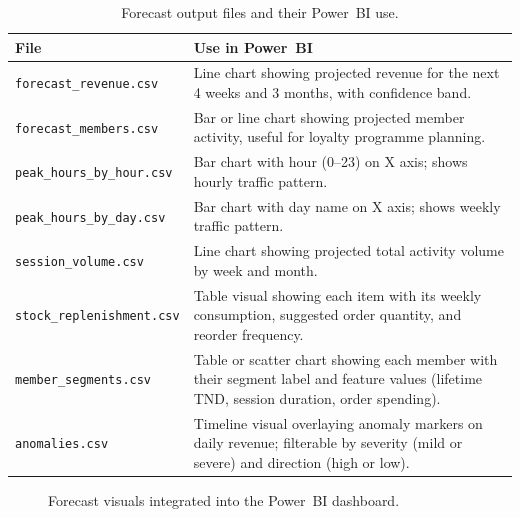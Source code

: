 \documentclass[12pt, a4paper]{report}
\begin{document}
\begin{table}[H]
  \centering
  \caption{Forecast output files and their Power~BI use.\label{tab:forecast_files}}
  \begin{tabular}{p{5cm} p{7.5cm}}
    \toprule
    \textbf{File} & \textbf{Use in Power~BI} \\
    \midrule
    \texttt{forecast\_revenue.csv}
      & Line chart showing projected revenue for the next 4 weeks and 3 months,
        with confidence band. \\[4pt]
    \texttt{forecast\_members.csv}
      & Bar or line chart showing projected member activity, useful for
        loyalty programme planning. \\[4pt]
    \texttt{peak\_hours\_by\_hour.csv}
      & Bar chart with hour (0--23) on X axis; shows hourly traffic pattern. \\[4pt]
    \texttt{peak\_hours\_by\_day.csv}
      & Bar chart with day name on X axis; shows weekly traffic pattern. \\[4pt]
    \texttt{session\_volume.csv}
      & Line chart showing projected total activity volume by week and month. \\[4pt]
    \texttt{stock\_replenishment.csv}
      & Table visual showing each item with its weekly consumption, suggested
        order quantity, and reorder frequency. \\[4pt]
    \texttt{member\_segments.csv}
      & Table or scatter chart showing each member with their segment label
        and feature values (lifetime TND, session duration, order spending). \\[4pt]
    \texttt{anomalies.csv}
      & Timeline visual overlaying anomaly markers on daily revenue; filterable
        by severity (mild or severe) and direction (high or low). \\
    \bottomrule
  \end{tabular}
\end{table}

\begin{figure}[H]
  \centering
  \caption{Forecast visuals integrated into the Power~BI dashboard.\label{fig:forecast_pbi}}
\end{figure}
\end{document}
